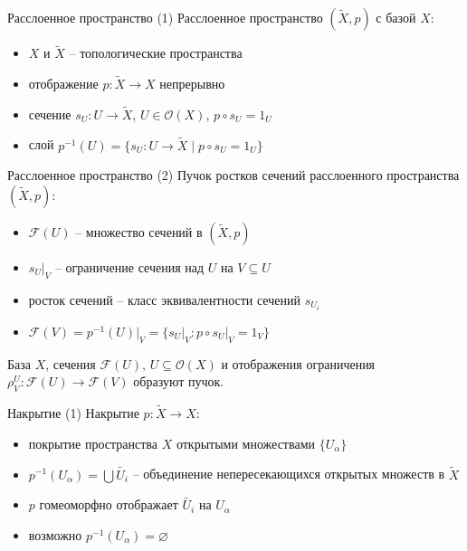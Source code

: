 \documentclass{beamer}
\begin{document}
\begin{frame}{Расслоенное пространство (1)}
Расслоенное пространство $(\widetilde{X}, p)$ с базой $X$:\\
\bigskip
\begin{itemize}
    \item $X$ и $\widetilde{X}$ -- топологические пространства
    \item отображение $p : \widetilde{X} \to X$ непрерывно
	\item сечение $s_U : U \to \widetilde{X}$, $U \in \mathcal{O}(X)$, $p \circ s_U = 1_U$
    \item слой $p^{-1}(U) = \{ s_U : U \to \widetilde{X} \; \vert \; p \circ s_U = 1_U \}$
\end{itemize}
\end{frame}

\begin{frame}{Расслоенное пространство (2)}
Пучок ростков сечений расслоенного пространства $(\widetilde{X}, p)$:\\
\bigskip
\begin{itemize}
    \item $\mathcal{F}(U)$ -- множество сечений в $(\widetilde{X}, p)$ 
    \item $s_U \vert_V$ -- ограничение сечения над $U$ на $V \subseteq U$
    \item росток сечений -- класс эквивалентности сечений $s_{U_i}$
    \item $\mathcal{F}(V) = p^{-1}(U) \vert_V = \{ s_U \vert_V : p \circ s_U \vert_V = 1_V \}$
\end{itemize}
\bigskip
База $X$, сечения $\mathcal{F}(U)$, $U \subseteq \mathcal{O}(X)$ и отображения ограничения $\rho^U_V : \mathcal{F}(U) \to \mathcal{F}(V)$ образуют пучок.
\end{frame}

\begin{frame}{Накрытие (1)}
Накрытие $p : \widetilde{X} \to X$:
\bigskip
\begin{itemize}
	\item покрытие пространства $X$ открытыми множествами $\{ U_\alpha \}$
	\item $p^{-1}(U_\alpha) = \bigcup \widetilde{U_i}$ -- объединение непересекающихся открытых множеств в $\widetilde{X}$
	\item $p$ гомеоморфно отображает $\widetilde{U_i}$ на $U_\alpha$
	\item возможно $p^{-1}(U_\alpha) = \varnothing$
\end{itemize}
\end{frame}
\end{document}
